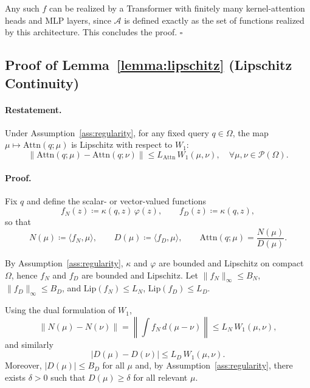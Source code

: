 \documentclass{article}
\theoremstyle{plain}
\theoremstyle{definition}
\theoremstyle{remark}
\newcommand{\OmegaSpace}{\Omega} %
\newcommand{\Pspace}{\mathcal{P}(\OmegaSpace)} %
\newcommand{\Wass}[1]{W_{#1}} %
\newcommand{\Attn}{\text{Attn}}
\begin{document}
Any such $f$ can be realized by a Transformer with finitely many kernel-attention heads
and MLP layers, since $\mathcal{A}$ is defined exactly as the set of functions realized
by this architecture. This concludes the proof. \hfill$\square$

\subsection{Proof of Lemma~\ref{lemma:lipschitz} (Lipschitz Continuity)}
\label{app:proof_lipschitz}

\paragraph{Restatement.}
Under Assumption~\ref{ass:regularity}, for any fixed query $q\in\OmegaSpace$, the map
$\mu\mapsto \Attn(q;\mu)$ is Lipschitz with respect to $\Wass{1}$:
\[
    \big\|\Attn(q;\mu)-\Attn(q;\nu)\big\|
    \le
    L_{\Attn}\,\Wass{1}(\mu,\nu),
    \quad \forall \mu,\nu\in\Pspace.
\]

\paragraph{Proof.}
Fix $q$ and define the scalar- or vector-valued functions
\[
    f_N(z) \coloneqq \kappa(q,z)\,\varphi(z),
    \qquad
    f_D(z) \coloneqq \kappa(q,z),
\]
so that
\[
    N(\mu) \coloneqq \langle f_N,\mu\rangle,
    \qquad
    D(\mu) \coloneqq \langle f_D,\mu\rangle,
    \qquad
    \Attn(q;\mu) = \frac{N(\mu)}{D(\mu)}.
\]

By Assumption~\ref{ass:regularity}, $\kappa$ and $\varphi$ are bounded and Lipschitz on
compact $\OmegaSpace$, hence $f_N$ and $f_D$ are bounded and Lipschitz. Let
$\|f_N\|_\infty \le B_N$, $\|f_D\|_\infty \le B_D$, and
$\mathrm{Lip}(f_N) \le L_N$, $\mathrm{Lip}(f_D) \le L_D$.

Using the dual formulation of $\Wass{1}$,
\[
    \|N(\mu)-N(\nu)\|
    =
    \left\|\int f_N\, d(\mu-\nu)\right\|
    \le
    L_N \, \Wass{1}(\mu,\nu),
\]
and similarly
\[
    |D(\mu)-D(\nu)|
    \le
    L_D \, \Wass{1}(\mu,\nu).
\]
Moreover, $|D(\mu)|\le B_D$ for all $\mu$ and, by Assumption~\ref{ass:regularity}, there
exists $\delta>0$ such that $D(\mu)\ge\delta$ for all relevant $\mu$.
\end{document}
